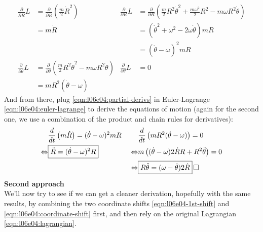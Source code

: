\documentclass[solutions.tex]{subfiles}
\begin{document}
\begin{align}
	\frac{\partial}{\partial\dot{R}}L &=
		\frac{\partial}{\partial\dot{R}}
			\left(\frac{m}{2}\dot{R}^2\right)
	&  \frac{\partial}{\partial R}L &=
		\frac{\partial}{\partial R}
			\left(\frac{m}{2}R^2\dot\theta^2+
			\frac{m\omega^2}{2}R^2 - m\omega R^2\dot\theta\right)\nonumber\\
	~ &= m\dot{R}
	& ~ &= (\dot\theta^2+\omega^2-2\omega\dot\theta)mR\nonumber\\
	~ & ~
	& ~ &= (\dot\theta-\omega)^2mR\nonumber\\
	\frac{\partial}{\partial\dot\theta}L &=
		\frac{\partial}{\partial\dot\theta}
			\left(\frac{m}{2}R^2\dot\theta^2-m\omega R^2\dot\theta\right)
	& \frac{\partial}{\partial\theta}L &= 0\nonumber\\
	~ &= mR^2(\dot\theta-\omega)
	& ~ & ~
	\label{eqn:l06e04:partial-derivs}
\end{align}
And from there, plug \eqref{eqn:l06e04:partial-derivs} in
Euler-Lagrange \eqref{eqn:l06e04:euler-lagrange} to derive the
equations of motion (again for the second one, we use a combination
of the product and chain rules for derivatives):
\begin{align*}
	~ & \frac{d}{dt}\left(m\dot{R}\right) = (\dot\theta-\omega)^2mR
	& ~ & \frac{d}{dt}\left(mR^2(\dot\theta-\omega)\right) = 0\\
	\Leftrightarrow & \boxed{\ddot{R} = (\dot\theta-\omega)^2R}
	& ~ \Leftrightarrow & m\left((\dot\theta-\omega)2\dot{R}R+R^2\ddot\theta\right)=0 \\
	~ & ~
	& ~ \Leftrightarrow & \boxed{R\ddot\theta = (\omega-\dot\theta)2\dot{R}} \qed
\end{align*}
\hr
\textbf{Second approach}\\
We'll now try to see if we can get a cleaner derivation, hopefully
with the same results, by combining the two coordinate shifts
\eqref{eqn:l06e04-1st-shift} and \eqref{eqn:l06e04:coordinate-shift}
first, and then rely on the original Lagrangian \eqref{eqn:l06e04:lagrangian}.\\
\end{document}
